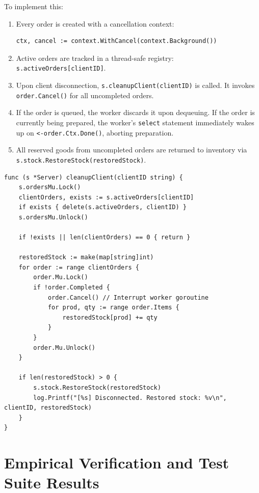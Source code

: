 \documentclass{labreport}
\begin{document}
To implement this:
\begin{enumerate}
    \item Every order is created with a cancellation context:
    \begin{lstlisting}[style=golang]
    ctx, cancel := context.WithCancel(context.Background())
    \end{lstlisting}
    \item Active orders are tracked in a thread-safe registry: \texttt{s.activeOrders[clientID]}.
    \item Upon client disconnection, \texttt{s.cleanupClient(clientID)} is called. It invokes \texttt{order.Cancel()} for all uncompleted orders.
    \item If the order is queued, the worker discards it upon dequeuing. If the order is currently being prepared, the worker's \texttt{select} statement immediately wakes up on \texttt{<-order.Ctx.Done()}, aborting preparation.
    \item All reserved goods from uncompleted orders are returned to inventory via \texttt{s.stock.RestoreStock(restoredStock)}.
\end{enumerate}

\begin{lstlisting}[style=golang, caption={Atomic Cleanup and Stock Rollback on Disconnect}]
func (s *Server) cleanupClient(clientID string) {
    s.ordersMu.Lock()
    clientOrders, exists := s.activeOrders[clientID]
    if exists { delete(s.activeOrders, clientID) }
    s.ordersMu.Unlock()

    if !exists || len(clientOrders) == 0 { return }

    restoredStock := make(map[string]int)
    for order := range clientOrders {
        order.Mu.Lock()
        if !order.Completed {
            order.Cancel() // Interrupt worker goroutine
            for prod, qty := range order.Items {
                restoredStock[prod] += qty
            }
        }
        order.Mu.Unlock()
    }

    if len(restoredStock) > 0 {
        s.stock.RestoreStock(restoredStock)
        log.Printf("[%s] Disconnected. Restored stock: %v\n", clientID, restoredStock)
    }
}
\end{lstlisting}

\newpage

\section{Empirical Verification and Test Suite Results}
\end{document}
